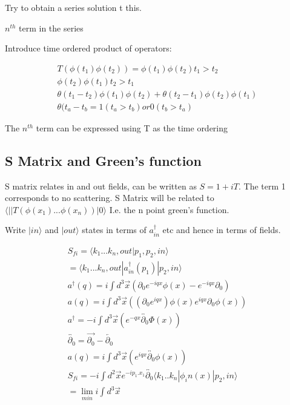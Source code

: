 \documentclass[]{article}
\begin{document}
	Try to obtain a series solution t this.
	
	    
	
	$n^{th}$ term in the series 
	
	
	Introduce time ordered product of operators:
	
	\begin{align}
	T(\phi(t_1)\phi(t_2)) = \phi(t_1)\phi(t_2) t_1 > t_2 \\
	 \phi(t_2)\phi(t_1) t_2 > t_1 \\
	 \theta(t_1 - t_2)\phi(t_1)\phi(t_2) + \theta(t_2-t_1)\phi(t_2)\phi(t_1) \\
	 \theta(t_a - t_b = 1 (t_a > t_b) or 0(t_b > t_a)
	\end{align}
	
	The $n^{th}$ term can be expressed using T as the time ordering
	

	
	\subsection{S Matrix and Green's function}
	S matrix relates in and out fields, can be written as $S = 1 + iT$. The term 1 corresponds to no scattering. S Matrix will be related to $\langle||T(\phi(x_1)...\phi(x_n))|0\rangle$ I.e. the n point green's function.
	
	Write $|in\rangle$ and $|out\rangle$ states in terms of $a^\dagger_{in}$ etc and hence in terms of fields.
	
	\begin{align}
		S_{fi} = \langle k_1...k_n, out | p_1, p_2, in \rangle \\
		= \langle k_1...k_n, out | a^\dagger_{in}(p_1)|p_2, in\rangle \\
		a^\dagger(q) = i\int d^3\vec{x}(\partial_0e^{-iqx}\phi(x) - e^{-iqx}\partial_0)\\
		a(q) = i\int d^3\vec{x}((\partial_0e^{iqx})\phi(x)  e^{iqx}\partial_0\phi(x))\\
		a^\dagger = -i\int d^3\vec{x}(e^{-qx}\overleftrightarrow{\partial_0}\Phi(x)) \\
		\overleftrightarrow{\partial_0} = \vec{\partial_0} - \overleftarrow{\partial_0} \\
		a(q) = i\int d^3\vec{x}(e^{iqx}\overleftrightarrow{\partial_0}\phi(x)) \\
		S_{fi} = -i\int d^2\vec{x}e^{-ip_1.x_1}\overleftrightarrow{\partial_0}\langle k_1 .. k_n|\phi_in(x)|p_2, in\rangle \\
		=\lim\limits_{min} i\int d^3\vec{x} \\
	\end{align}
	
\end{document}
